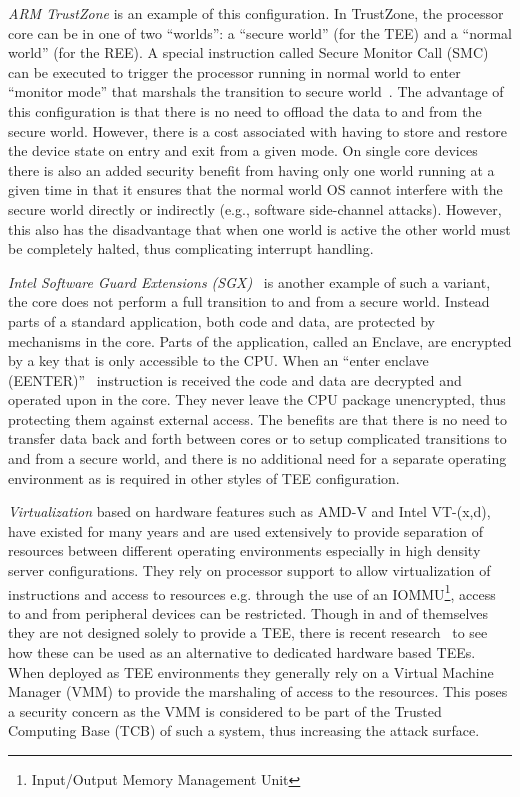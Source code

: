 \documentclass[10pt,conference,letterpaper]{IEEEtran}
\begin{document}
\noindent\textit{ARM TrustZone} is an example of this configuration. In TrustZone, the processor core can be in one of two ``worlds'': a ``secure world'' (for the TEE) and a ``normal world'' (for the REE). A special instruction called Secure Monitor Call (SMC) can be executed to trigger the processor running in normal world to enter ``monitor mode'' that marshals the transition to secure world~\cite{web:TRUSTZONE}.  The advantage of this configuration is that there is no need to offload the data to and from the secure world. However, there is a cost associated with having to store and restore the device state on entry and exit from a given mode.  On single core devices there is also an added security benefit from having only one world running at a given time in that it ensures that the normal world OS cannot 
interfere with the secure world directly or indirectly (e.g., software side-channel attacks). However, this also has the disadvantage that when one world is active the other world must be completely halted, thus complicating interrupt handling.

\noindent\textit{Intel Software Guard Extensions (SGX)}~\cite{SGX13,web:SGX} is another example of such a variant, the core does not perform a full transition to and from a secure world.  Instead parts of a standard application, both code and data, are protected by mechanisms in the core. Parts of the application, called an Enclave, are encrypted by a key that is only accessible to the CPU.  When an ``enter enclave (EENTER)''~\cite{web:SGX2} instruction is received the code and data are decrypted and operated upon in the core. They never leave the CPU package unencrypted, thus protecting them against external access.  The benefits are that there is no need to transfer data back and forth between cores or to setup complicated transitions to and from a secure world, and there is no additional need for a separate operating environment as is required in other styles of TEE configuration.  

\noindent\textit{Virtualization} based on hardware features such as AMD-V and Intel VT-(x,d), have existed for many years and are used extensively to provide separation of resources between different operating environments especially in high density server configurations.  They rely on processor support to allow virtualization of instructions and access to resources e.g. through the use of an IOMMU\footnote{Input/Output Memory Management Unit}, access to and from peripheral devices can be restricted.  Though in and of themselves they are not designed solely to provide a TEE, there is recent research~\cite{jour:cheng2013appshield,DBLP:conf/eurosys/McCunePPRI08} to see how these can be used as an alternative to dedicated hardware based TEEs.  When deployed as TEE environments they generally rely on a Virtual Machine Manager (VMM) to provide the marshaling of access to the resources.  This poses a security concern as the VMM is considered to be part of the Trusted Computing Base (TCB) of such a system, thus increasing the attack surface.
\fi
\end{document}
